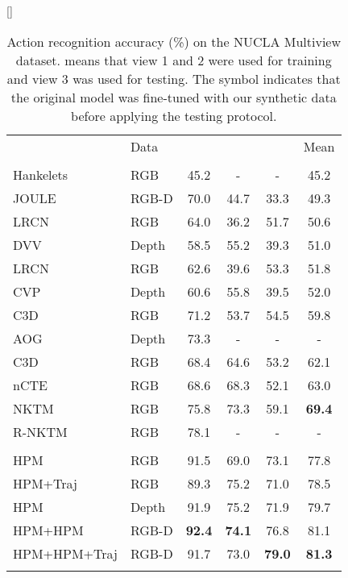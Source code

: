 \documentclass[twocolumn]{svjour3}          \smartqed  \usepackage{graphicx}
\begin{document}
\begin{table*}
[\FBwidth]
{\caption{Action recognition accuracy (\%) on the NUCLA Multiview dataset.  means that view 1 and 2 were used for training and view 3 was used for testing. The symbol  indicates that the original model was fine-tuned with our synthetic data before applying the testing protocol.}
\label{tab:nucla_comp}}
{
\begin{tabular}{llcccc}
\hline\noalign{\smallskip}
\multicolumn{ 1}{l}{Method} & \multicolumn{ 1}{l}{Data} &  &  &  & \multicolumn{ 1}{c}{Mean} \\ 
\noalign{\smallskip}\hline\noalign{\smallskip}
\multicolumn{ 6}{c}{\textbf{Baseline}} \\
\noalign{\smallskip}\hline\noalign{\smallskip}

Hankelets~\citep{Hankelets} & RGB & 45.2 & - & - & 45.2 \\ JOULE~\citep{hu2015jointly} & RGB-D & 70.0 & 44.7 & 33.3 & 49.3 \\ LRCN~\citep{LRCN} & RGB & 64.0 & 36.2 & 51.7 & 50.6 \\
DVV~\citep{DVV} & Depth & 58.5 & 55.2 & 39.3 & 51.0 \\ LRCN & RGB & 62.6 & 39.6 & 53.3 & 51.8 \\
CVP~\citep{CVP} & Depth & 60.6 & 55.8 & 39.5 & 52.0 \\ C3D~\citep{tran2015learning} & RGB & 71.2 & 53.7 & 54.5 & 59.8 \\ 
AOG~\citep{AOG} & Depth & 73.3 & - & - & - \\ C3D & RGB & 68.4 & 64.6 & 53.2 & 62.1 \\
nCTE~\citep{nCTE} & RGB & 68.6 & 68.3 & 52.1 & 63.0 \\ NKTM~\citep{NKTM} & RGB & 75.8 & 73.3 & 59.1 & \textbf{69.4} \\ R-NKTM~\citep{rahmani2017learning} & RGB & 78.1 & - & - & - \\ 

\noalign{\smallskip}\hline\noalign{\smallskip}
\multicolumn{ 6}{c}{\textbf{Proposed}} \\ \noalign{\smallskip}\hline\noalign{\smallskip}

HPM & RGB & 91.5 & 69.0 & 73.1 & 77.8 \\ HPM+Traj & RGB & 89.3 & 75.2 & 71.0 & 78.5 \\ HPM & Depth & 91.9 & 75.2 & 71.9 & 79.7 \\ HPM+HPM & RGB-D & \textbf{92.4} & \textbf{74.1} & 76.8 & 81.1 \\ HPM+HPM+Traj & RGB-D & 91.7 & 73.0 & \textbf{79.0} & \textbf{81.3} \\ \hline\noalign{\smallskip}
\end{tabular}
}
\end{table*}
\end{document}
